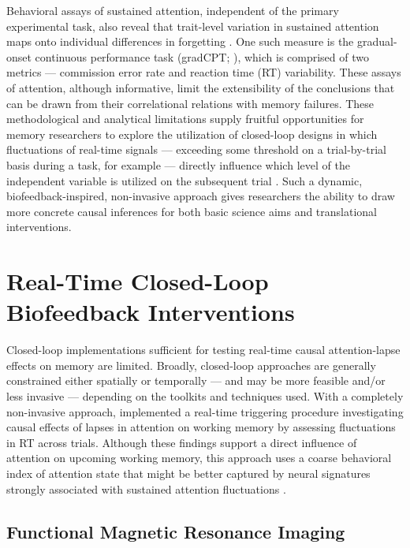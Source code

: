 Behavioral assays of sustained attention, independent of the primary experimental task, also reveal that trait-level variation in sustained attention maps onto individual differences in forgetting \parencite{madore2020memory}. One such measure is the gradual-onset continuous performance task (gradCPT; \cite{esterman2013zone,rosenberg2013sustaining}), which is comprised of two metrics --- commission error rate and reaction time (RT) variability. These assays of attention, although informative, limit the extensibility of the conclusions that can be drawn from their correlational relations with memory failures. These methodological and analytical limitations supply fruitful opportunities for memory researchers to explore the utilization of closed-loop designs in which fluctuations of real-time signals --- exceeding some threshold on a trial-by-trial basis during a task, for example --- directly influence which level of the independent variable is utilized on the subsequent trial \parencite{laconte2011decoding}. Such a dynamic, biofeedback-inspired, non-invasive approach gives researchers the ability to draw more concrete causal inferences for both basic science aims and translational interventions.

\section{Real-Time Closed-Loop Biofeedback Interventions}

Closed-loop implementations sufficient for testing real-time causal attention-lapse effects on memory are limited. Broadly, closed-loop approaches are generally constrained either spatially or temporally --- and may be more feasible and/or less invasive --- depending on the toolkits and techniques used. With a completely non-invasive approach, \textcite{debettencourt2019realtime} implemented a real-time triggering procedure investigating causal effects of lapses in attention on working memory by assessing fluctuations in RT across trials. Although these findings support a direct influence of attention on upcoming working memory, this approach uses a coarse behavioral index of attention state that might be better captured by neural signatures strongly associated with sustained attention fluctuations \parencite{murray2011markers,myers2014oscillatory,adam2015contribution,giesbrecht2006pre,debettencourt2019realtime}.

\subsection{Functional Magnetic Resonance Imaging}


